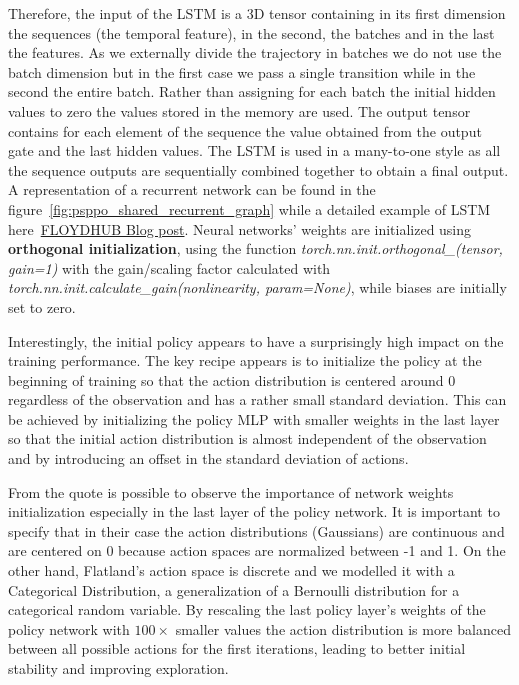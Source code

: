 \documentclass[11pt, a4paper, hidelinks]{report}
\begin{document}
Therefore, the input of the LSTM is a 3D tensor containing in its first dimension the sequences (the temporal feature), in the second, the batches and in the last the features.
As we externally divide the trajectory in batches we do not use the batch dimension but in the first case we pass a single transition while in the second the entire batch.
Rather than assigning for each batch the initial hidden values to zero the values stored in the memory are used.
The output tensor contains for each element of the sequence the value obtained from the output gate and the last hidden values.
The LSTM is used in a many-to-one style as all the sequence outputs are sequentially combined together to obtain a final output.
A representation of a recurrent network can be found in the figure~\ref{fig:psppo_shared_recurrent_graph} while a detailed example of LSTM here~\href{https://blog.floydhub.com/long-short-term-memory-from-zero-to-hero-with-pytorch/}{FLOYDHUB Blog post}.
Neural networks' weights are initialized using \textbf{orthogonal initialization}, using the function \textit{torch.nn.init.orthogonal\_(tensor, gain=1)} with the gain/scaling factor calculated with \textit{torch.nn.init.calculate\_gain(nonlinearity, param=None)}, while biases are initially set to zero.

\begin{quoting}[font=itshape, begintext={"}, endtext={"\citep{ppo-implementation-2}}]
Interestingly, the initial policy appears to have a surprisingly high impact on the training performance.
The key recipe appears is to initialize the policy at the beginning of training so that the action distribution is centered around 0 regardless of the observation and has a rather small standard deviation.
This can be achieved by initializing the policy MLP with smaller weights in the last layer so that the initial action distribution is almost independent of the observation and by introducing an offset in the standard deviation of actions.
\end{quoting}

From the quote is possible to observe the importance of network weights initialization especially in the last layer of the policy network.
It is important to specify that in their case the action distributions (Gaussians) are continuous and are centered on 0 because action spaces are normalized between -1 and 1.
On the other hand, Flatland's action space is discrete and we modelled it with a Categorical Distribution, a generalization of a Bernoulli distribution for a categorical random variable.
By rescaling the last policy layer's weights of the policy network with $100\times$ smaller values the action distribution is more balanced between all possible actions for the first iterations, leading to better initial stability and improving exploration.
\end{document}
